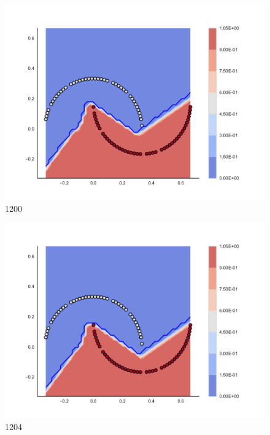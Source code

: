 \begin{subfigure}[b]{0.09\textwidth}
    \includegraphics[clip, trim=2.35cm 1.75cm 4.5cm 0cm,width=\textwidth]{img/convergence/1200.pdf}
    \caption{1200}
    \label{fig:convergence_1200}
\end{subfigure}
%
\begin{subfigure}[b]{0.09\textwidth}
    \includegraphics[clip, trim=2.35cm 1.75cm 4.5cm 0cm,width=\textwidth]{img/convergence/1204.pdf}
    \caption{1204}
    \label{fig:convergence_1204}
\end{subfigure}
%
